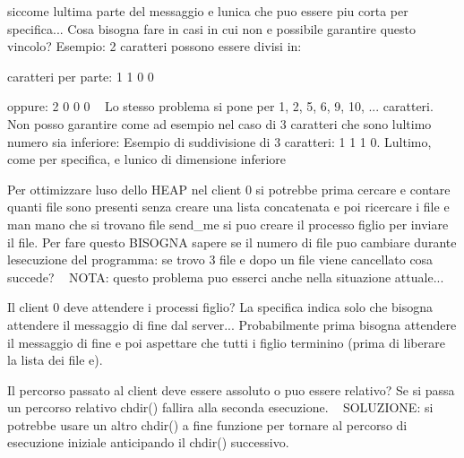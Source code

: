 
\begin{DoxyRefList}
\item[\label{warning__warning000007}%
\Hypertarget{warning__warning000007}%
Globale \hyperlink{client_8h_a54b47b58f228d7bc9827d2919687e25a}{operazioni\+\_\+figlio} (char $\ast$file\+Path)]siccome l\textquotesingle{}ultima parte del messaggio e\textquotesingle{} l\textquotesingle{}unica che puo\textquotesingle{} essere piu\textquotesingle{} corta per specifica... Cosa bisogna fare in casi in cui non e\textquotesingle{} possibile garantire questo vincolo? Esempio\+: 2 caratteri possono essere divisi in\+:
\begin{DoxyItemize}
\item caratteri per parte\+: 1 1 0 0
\item oppure\+: 2 0 0 0 ~\newline
 Lo stesso problema si pone per 1, 2, 5, 6, 9, 10, ... caratteri. ~\newline
 Non posso garantire come ad esempio nel caso di 3 caratteri che sono l\textquotesingle{}ultimo numero sia inferiore\+: Esempio di suddivisione di 3 caratteri\+: 1 1 1 0. L\textquotesingle{}ultimo, come per specifica, e\textquotesingle{} l\textquotesingle{}unico di dimensione inferiore 
\end{DoxyItemize}
\item[\label{warning__warning000004}%
\Hypertarget{warning__warning000004}%
Globale \hyperlink{client_8h_a48d605ff689f470746c858648f0a98c2}{S\+I\+G\+I\+N\+T\+Signal\+Handler} (int sig)]Per ottimizzare l\textquotesingle{}uso dello H\+E\+AP nel client 0 si potrebbe prima cercare e contare quanti file sono presenti senza creare una lista concatenata e poi ricercare i file e man mano che si trovano file send\+\_\+me si puo\textquotesingle{} creare il processo figlio per inviare il file. Per fare questo B\+I\+S\+O\+G\+NA sapere se il numero di file puo\textquotesingle{} cambiare durante l\textquotesingle{}esecuzione del programma\+: se trovo 3 file e dopo un file viene cancellato cosa succede? ~\newline
 N\+O\+TA\+: questo problema puo\textquotesingle{} esserci anche nella situazione attuale...

Il client 0 deve attendere i processi figlio? La specifica indica solo che bisogna attendere il messaggio di fine dal server... Probabilmente prima bisogna attendere il messaggio di fine e poi aspettare che tutti i figlio terminino (prima di liberare la lista dei file e).

Il percorso passato al client deve essere assoluto o puo\textquotesingle{} essere relativo? Se si passa un percorso relativo chdir() fallira\textquotesingle{} alla seconda esecuzione. ~\newline
 S\+O\+L\+U\+Z\+I\+O\+NE\+: si potrebbe usare un altro chdir() a fine funzione per tornare al percorso di esecuzione iniziale anticipando il chdir() successivo.
\end{DoxyRefList}